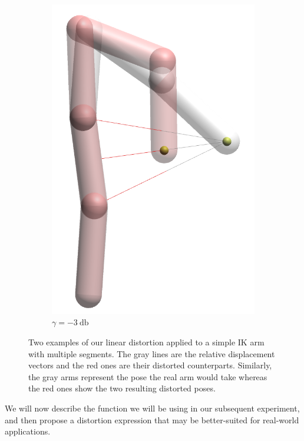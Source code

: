 \begin{figure}[h]
\begin{subfigure}[b]{0.2\textwidth}
        \includegraphics[width=\textwidth]{Figures/simple_distortion_-3.png}
        \caption{$\gamma = \SI{-3}{\decibel}$}
    \end{subfigure}
    \caption{Two examples of our linear distortion applied to a simple IK arm with multiple segments. The gray lines are the relative displacement vectors and the red ones are their distorted counterparts. Similarly, the gray arms represent the pose the real arm would take whereas the red ones show the two resulting distorted poses.}
    \label{fig:armExamples}
\end{figure}

We will now describe the function we will be using in our subsequent experiment, and then propose a distortion expression that may be better-suited for real-world applications.

